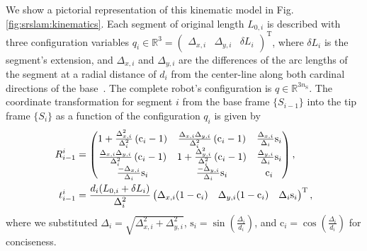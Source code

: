 
We show a pictorial representation of this kinematic model in Fig. \ref{fig:srslam:kinematics}. Each segment of original length $L_{0,i}$ is described with three configuration variables 
%
    $q_i \in \mathbb{R}^{3} = \begin{pmatrix}\Delta_{x,i} & \Delta_{y,i} & \delta L_i\end{pmatrix}^\mathrm{T}$,
where $\delta L_i$ is the segment's extension, and $\Delta_{x,i}$ and $\Delta_{y,i}$ are the differences of the arc lengths of the segment at a radial distance of $d_i$ from the center-line along both cardinal directions of the base~\cite{della2020improved}. The complete robot's configuration is $q \in \mathbb{R}^{3 n_{\mathrm{S}}}$. The coordinate transformation for segment $i$ from the base frame $\{ S_{i-1} \}$ into the tip frame $\{ S_{i} \}$ as a function of the configuration $q_i$ is given by~\cite{della2020improved}
\begin{equation}
\label{eq:srslam:transformation_improved_pcc}
\begin{split}
    R_{i-1}^{i} &= 
    \begin{pmatrix}
        1 + \frac{\Delta_{x,i}^2}{\Delta_{i}^2} \left ( \mathrm{c}_i - 1 \right ) & \frac{\Delta_{x,i} \Delta_{y,i}}{\Delta_{i}^2} \left ( \mathrm{c}_i - 1 \right ) & \frac{\Delta_{x,i}}{\Delta_i} \mathrm{s}_i\\
        \frac{\Delta_{x,i} \Delta_{y,i}}{\Delta_{i}^2} \left ( \mathrm{c}_i - 1 \right ) & 1 + \frac{\Delta_{y,i}^2}{\Delta_{i}^2} \left ( \mathrm{c}_i - 1 \right ) & \frac{\Delta_{y,i}}{\Delta_i} \mathrm{s}_i\\
        \frac{-\Delta_{x,i}}{\Delta_i} \mathrm{s}_i & \frac{-\Delta_{y,i}}{\Delta_i} \mathrm{s}_i & \mathrm{c}_i
    \end{pmatrix},\\
    \vspace{0.25em}
    t_{i-1}^{i} &= \frac{d_i ( L_{0,i}+\delta L_i)}{\Delta_i^2}
    \begin{pmatrix}
        \Delta_{x,i} (1 - \mathrm{c}_i) & \Delta_{y,i} (1 - \mathrm{c}_i) & \Delta_{i} \mathrm{s}_i
    \end{pmatrix}^{\mathrm{T}},
\end{split}
\end{equation}
where we substituted $\Delta_i = \sqrt{\Delta_{x,i}^2 + \Delta_{y,i}^2}$, $\mathrm{s}_i = \sin \left ( \frac{\Delta_i}{d_i} \right )$, and $\mathrm{c}_i = \cos \left ( \frac{\Delta_i}{d_i} \right )$ for conciseness.

